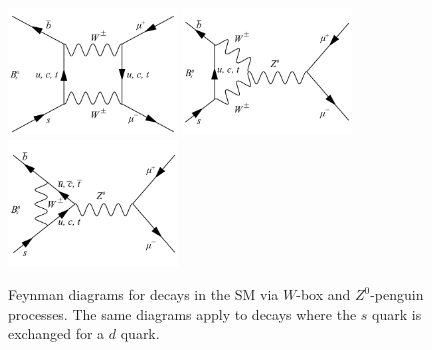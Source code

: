 \begin{figure}[bt]
    \centering
        \includegraphics[width=0.4\textwidth]{./Figs/Theory/W_diagram.pdf}
        \includegraphics[width=0.4\textwidth]{./Figs/Theory/Z0_penguin_v1.pdf}
        \includegraphics[width=0.4\textwidth]{./Figs/Theory/Z0_penguin_v2.pdf}
    \caption{Feynman diagrams for \bsmumu decays in the SM via $W$-box and $Z^0$-penguin processes. The same diagrams apply to \bdmumu decays where the $s$ quark is exchanged for a $d$ quark.}
    \label{fig:SM_diag}
\end{figure}



